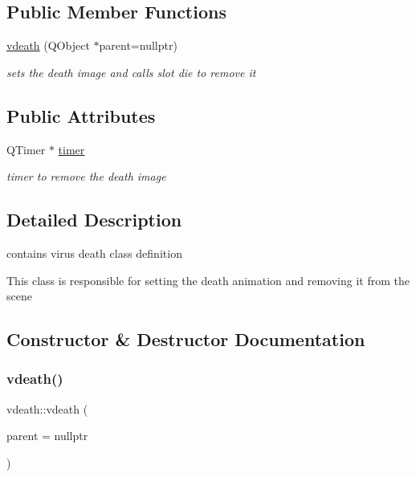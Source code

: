 \subsection*{Public Member Functions}
\begin{DoxyCompactItemize}
\item 
\hyperlink{classvdeath_a2b34067182c4e7773baa6cf99d1cf03d}{vdeath} (Q\+Object $\ast$parent=nullptr)
\begin{DoxyCompactList}\small\item\em sets the death image and calls slot die to remove it \end{DoxyCompactList}\end{DoxyCompactItemize}
\subsection*{Public Attributes}
\begin{DoxyCompactItemize}
\item 
\mbox{\label{classvdeath_ada84c7cc3712f6801b1a8043df9449e2}} 
Q\+Timer $\ast$ \hyperlink{classvdeath_ada84c7cc3712f6801b1a8043df9449e2}{timer}
\begin{DoxyCompactList}\small\item\em timer to remove the death image \end{DoxyCompactList}\end{DoxyCompactItemize}


\subsection{Detailed Description}
contains virus death class definition 

This class is responsible for setting the death animation and removing it from the scene 

\subsection{Constructor \& Destructor Documentation}
\mbox{\label{classvdeath_a2b34067182c4e7773baa6cf99d1cf03d}} 
\subsubsection{\texorpdfstring{vdeath()}{vdeath()}}
{\footnotesize\ttfamily vdeath\+::vdeath (\begin{DoxyParamCaption}\item[{Q\+Object $\ast$}]{parent = {\ttfamily nullptr} }\end{DoxyParamCaption})\hspace{0.3cm}{\ttfamily [explicit]}}



